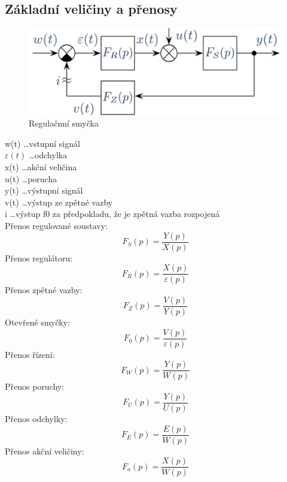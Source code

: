 \subsection*{Základní veličiny a přenosy}
\begin{figure}[H]
    \includegraphics[scale = 0.45]{images/reg.soustava2.png}
    \caption{Regulačnní smyčka}
\end{figure}
w(t) \dots vstupní signál \\
$\varepsilon(t)$ \dots odchylka \\
x(t) \dots akční veličina \\
u(t) \dots porucha \\
y(t) \dots výstupní signál\\
v(t) \dots výstup ze zpětné vazby\\
i    \dots výstup f0 za předpokladu, že je zpětná vazba rozpojená\\

\noindent
Přenos regulované soustavy:
\begin{equation}
    F_S(p) = \frac{Y(p)}{X(p)}
\end{equation}
Přenos regulátoru:
\begin{equation}
    F_R(p) = \frac{X(p)}{\varepsilon(p)}
\end{equation}
Přenos zpětné vazby:
\begin{equation}
    F_Z(p) = \frac{V(p)}{Y(p)}
\end{equation}
Otevřené smyčky:
\begin{equation}
    F_0(p) = \frac{V(p)}{\varepsilon(p)}
\end{equation}
Přenos řízení:
\begin{equation}
    F_W(p) = \frac{Y(p)}{W(p)}
\end{equation}
Přenos poruchy:
\begin{equation}
    F_U(p) = \frac{Y(p)}{U(p)}
\end{equation}
Přenos odchylky:
\begin{equation}
    F_E(p)=\frac{E(p)}{W(p)}
\end{equation}
Přenos akční veličiny:
\begin{equation}
    F_a(p) = \frac{X(p)}{W(p)}
\end{equation}
